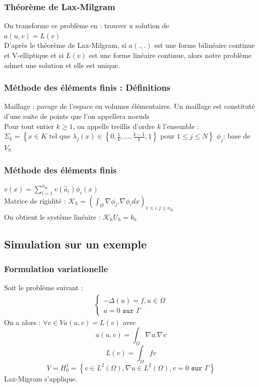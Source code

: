 \documentclass[handout]{beamer}
\begin{document}
\begin{frame}
	\frametitle{Théorème de Lax-Milgram}
	On transforme ce problème en : trouver u solution de \\
	$a\left(u, v\right)=L\left(v\right)$\\
	D'après le théorème de Lax-Milgram, si $a\left(.,.\right)$ est une forme bilinéaire continue et V-elliptique et si $L\left(v\right)$ est une forme linéaire continue, alors notre problème admet une solution et elle est unique.
\end{frame}

\begin{frame}
		\frametitle{Méthode des éléments finis : Définitions}
		Maillage : pavage de l'espace en volumes élémentaires. Un maillage est constituté d'une suite de points que l'on appellera noeuds\\
		Pour tout entier $k\geq 1$, on appelle treillis d'ordre $k$ l'ensemble :\\
$\Sigma_{k}=\left\{ x\in K \text{ tel que } \lambda_{j}\left(x\right)\in\left\{0, \frac{1}{k},...,\frac{k-1}{k}, 1\right\} \text{ pour }1\leq j\leq N\right\}$
$\phi_{j} $: base de $V_h$
\end{frame}

\begin{frame}
	\frametitle{Méthode des éléments finis}
	$v(x)=\sum_{i=1}^{n_{d_{l}}}v\left(\hat{a}_{i}\right)\phi_{i}\left(x\right)$\\
	Matrice de rigidité : $\mathcal{K}_{h}=\left(\int_{\Omega}\nabla\phi_{j}.\nabla\phi_{i} dx\right)_{1\leq i, j\leq n_{d_{l}}}$\\
	On obtient le système linéaire : $\mathcal{K}_{h}U_{h}=b_{h}$
	

\end{frame}
\subsection[Simulation]{Simulation sur un exemple}
\begin{frame}
	\frametitle{Formulation variationelle}
	Soit le problème suivant :
\begin{align*}
\left\{\begin{matrix}
-\Delta\left(u\right)=f,  u\in\Omega\\
u=0 \texttt{ sur }\Gamma
\end{matrix}
 \right.
\end{align*}
On a alors :
$\forall v\in V a(u,v)=L(v)$
avec\\
\begin{equation*}
a(u,v)=\int_{\Omega}\nabla u.\nabla v
\end{equation*}
\begin{equation*}
L(v)=\int_{\Omega}fv
\end{equation*}
\begin{equation*}
V=H_{0}^{1}=\left\{v\in L^{2}\left(\Omega\right), \nabla u\in L^{2}\left(\Omega\right), v=0 \texttt{ sur }\Gamma\right\}
\end{equation*}
Lax-Migram s'applique.
\end{frame}
\end{document}
